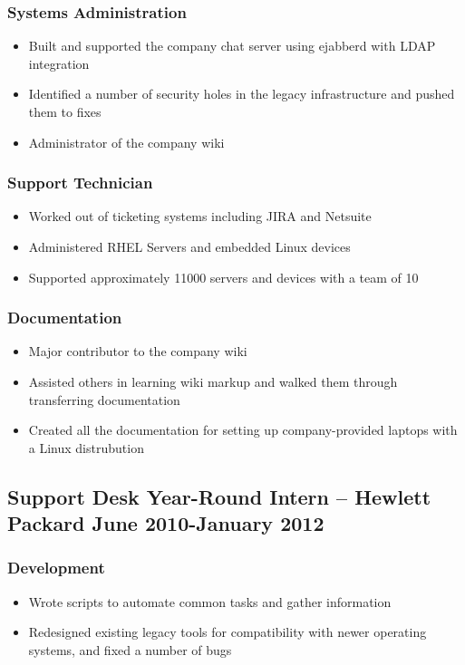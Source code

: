 \documentclass[10pt]{article}
\begin{document}
\subsubsection*{Systems Administration}
\begin{itemize}
    \item Built and supported the company chat server using ejabberd with LDAP integration
    \item Identified a number of security holes in the legacy infrastructure and pushed them to fixes
    \item Administrator of the company wiki
\end{itemize}

\subsubsection*{Support Technician}
\begin{itemize}
    \item Worked out of ticketing systems including JIRA and Netsuite
    \item Administered RHEL Servers and embedded Linux devices
    \item Supported approximately 11000 servers and devices with a team of 10
\end{itemize}

\subsubsection*{Documentation}
\begin{itemize}
    \item Major contributor to the company wiki
    \item Assisted others in learning wiki markup and walked them through transferring documentation
    \item Created all the documentation for setting up company-provided laptops with a Linux distrubution
\end{itemize}

\subsection*{Support Desk Year-Round Intern -- Hewlett Packard  \hfill June 2010-January 2012}
\subsubsection*{Development}
\begin{itemize}
    \item Wrote scripts to automate common tasks and gather information
    \item Redesigned existing legacy tools for compatibility with newer operating systems, and fixed a number of bugs
\end{itemize}
\end{document}
